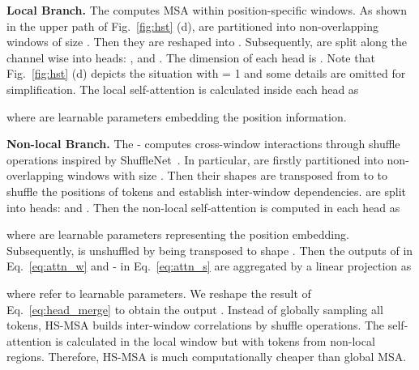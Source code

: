\documentclass{article}
\begin{document}
\textbf{Local Branch.} The  computes MSA within position-specific windows. As shown in the upper path of Fig.~\ref{fig:hst} (d),  are partitioned into non-overlapping windows of size . Then they are reshaped into . Subsequently,   are split along the channel wise into  heads: , and . The dimension of each head is . Note that Fig.~\ref{fig:hst} (d) depicts the situation with  = 1 and some details are omitted for simplification. The local self-attention  is calculated inside each head as

where  are learnable parameters embedding the position information. 

\textbf{Non-local Branch.} The - computes cross-window interactions through shuffle operations inspired by ShuffleNet~\cite{shufflenet}. In particular,   are firstly  partitioned into non-overlapping windows with  size  . Then their shapes are transposed from  to  to shuffle the positions of tokens and establish inter-window dependencies.  are split into  heads:  and . Then  the non-local self-attention  is computed in each head as 

where  are learnable parameters representing the position embedding. Subsequently,  is  unshuffled by being transposed to shape . Then the outputs of  in Eq.~\eqref{eq:attn_w} and - in Eq.~\eqref{eq:attn_s} are aggregated by a linear projection as

where  refer to learnable parameters. We reshape the result of Eq.~\eqref{eq:head_merge} to obtain the output  . 
Instead of globally sampling all tokens, HS-MSA builds inter-window correlations by shuffle operations. The self-attention is calculated in the local window but with tokens from non-local regions. Therefore, HS-MSA is much computationally cheaper than global MSA. 
\end{document}
